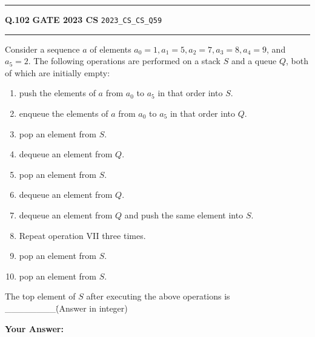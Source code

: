\documentclass[a4paper,10pt]{article}
\begin{document}
\vspace{6pt}\hrule height 0.35pt\vspace{6pt}
\noindent
\begin{tcolorbox}[
    blanker,
    sidebyside,
    sidebyside align=top,
    lefthand width=0.55\textwidth,
    top=4pt, bottom=4pt, left=0pt, right=0pt,
    middle=16pt,
    underlay={
        \draw[dashed, black!80, line width=0.8pt, dash pattern=on 4pt off 3pt]
            ([xshift=0.55\textwidth+8pt]frame.north west) --
            ([xshift=0.55\textwidth+8pt]frame.south west);
    }
]
\textbf{Q.102}  \hfill {\footnotesize\textbf{GATE 2023 CS} \quad \tiny\texttt{2023\_CS\_CS\_Q59}}
\vspace{2pt}\hrule height 0.3pt\vspace{4pt}

Consider a sequence $a$ of elements $a_0 = 1, a_1 = 5, a_2 = 7, a_3 = 8, a_4 = 9$, and $a_5 = 2$. The following operations are performed on a stack $S$ and a queue $Q$, both of which are initially empty:
\begin{enumerate}[label=\Roman*.,itemsep=0pt,topsep=2pt]
\item push the elements of $a$ from $a_0$ to $a_5$ in that order into $S$.
\item enqueue the elements of $a$ from $a_0$ to $a_5$ in that order into $Q$.
\item pop an element from $S$.
\item dequeue an element from $Q$.
\item pop an element from $S$.
\item dequeue an element from $Q$.
\item dequeue an element from $Q$ and push the same element into $S$.
\item Repeat operation VII three times.
\item pop an element from $S$.
\item pop an element from $S$.
\end{enumerate}
The top element of $S$ after executing the above operations is \_\_\_\_\_\_\_\_\. (Answer in integer)

\par\vspace{6pt}\noindent\textbf{Your Answer:} \fbox{\rule{0pt}{1.3ex}\hspace{3cm}}

\tcblower


\end{tcolorbox}
\end{document}
